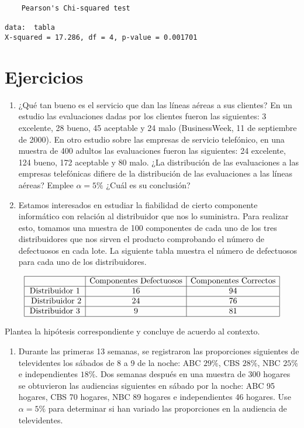 \documentclass[
  a4paper,
  oneside,
  openany]{book}
\providecommand{\tightlist}{%
  \setlength{\itemsep}{0pt}\setlength{\parskip}{0pt}}
\begin{document}
\begin{verbatim}
    Pearson's Chi-squared test

data:  tabla
X-squared = 17.286, df = 4, p-value = 0.001701
\end{verbatim}

\hypertarget{ejercicios-6}{%
\section{Ejercicios}\label{ejercicios-6}}

\begin{enumerate}
\def\labelenumi{\arabic{enumi}.}
\item
  ¿Qué tan bueno es el servicio que dan las líneas aéreas a sus clientes? En un estudio las evaluaciones dadas por los clientes fueron las siguientes: 3 excelente, 28 bueno, 45 aceptable y 24 malo (BusinessWeek, 11 de septiembre de 2000). En otro estudio sobre las empresas de servicio telefónico, en una muestra de 400 adultos las evaluaciones fueron las siguientes: 24 excelente, 124 bueno, 172 aceptable y 80 malo. ¿La distribución de las evaluaciones a las empresas telefónicas difiere de la distribución de las evaluaciones a las líneas aéreas? Emplee \(\alpha=5\%\) ¿Cuál es su conclusión?
\item
  Estamos interesados en estudiar la fiabilidad de cierto componente informático con relación al distribuidor que nos lo suministra. Para realizar esto, tomamos una muestra de 100 componentes de cada uno de los tres distribuidores que nos sirven el producto comprobando el número de defectuosos en cada lote. La siguiente tabla muestra el número de defectuosos para cada uno de los distribuidores.
\end{enumerate}

\[
\begin{array}{|c | c| c|}
\hline
&\mbox{Componentes Defectuosos}& \mbox{Componentes Correctos}\\
   \hline
\mbox{Distribuidor 1}& 16& 94  \\
  \hline
\mbox{ Distribuidor 2}&24&76\\
 \hline
\mbox{Distribuidor 3}&9&81\\
    \hline
\end{array}
\]

Plantea la hipótesis correspondiente y concluye de acuerdo al contexto.

\begin{enumerate}
\def\labelenumi{\arabic{enumi}.}
\setcounter{enumi}{2}
\tightlist
\item
  Durante las primeras 13 semanas, se registraron las proporciones siguientes de televidentes los sábados de 8 a 9 de la noche: ABC \(29\%\), CBS \(28\%\), NBC \(25\%\) e independientes \(18\%\). Dos semanas después en una muestra de 300 hogares se obtuvieron las audiencias siguientes en sábado por la noche: ABC 95 hogares, CBS 70 hogares, NBC 89 hogares e independientes 46 hogares. Use \(\alpha=5\%\) para determinar si han variado las proporciones en la audiencia de televidentes.
\end{enumerate}
\end{document}
